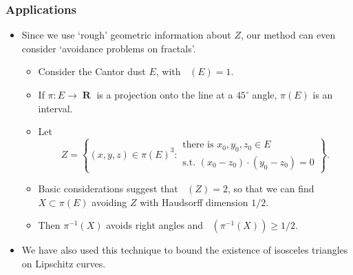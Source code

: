 \documentclass[usenames,dvipsnames]{beamer}
\DeclareMathOperator{\RR}{\textbf{R}}
\DeclareMathOperator{\hausdim}{\text{dim}_{\textbf{H}}}
\DeclareMathOperator{\minkdim}{\text{dim}_{\textbf{M}}}
\begin{document}
\begin{frame}
    \frametitle{Applications}

    \begin{itemize}
        \item Since we use `rough' geometric information about $Z$, our method can even consider `avoidance problems on fractals'.

        \pause
        \begin{itemize}
            \item Consider the Cantor dust $E$, with $\minkdim(E) = 1$.

            \pause
            \item If $\pi: E \to \RR$ is a projection onto the line at a $45^{\circ}$ angle, $\pi(E)$ is an interval.

            \pause
            \item Let
            \[ Z = \left\{ (x,y,z) \in \pi(E)^3 : \begin{array}{c}
            \text{there is $x_0, y_0, z_0 \in E$}\\
            \text{s.t. $(x_0 - z_0) \cdot (y_0 - z_0) = 0$}
        \end{array} \right\}. \]

            \pause
            \item Basic considerations suggest that $\minkdim(Z) = 2$, so that we can find $X \subset \pi(E)$ avoiding $Z$ with Haudsorff dimension $1/2$.

            \pause
            \item Then $\pi^{-1}(X)$ avoids right angles and $\hausdim(\pi^{-1}(X)) \geq 1/2$.
        \end{itemize}

        \pause
        \item We have also used this technique to bound the existence of isosceles triangles on Lipschitz curves.
    \end{itemize}
\end{frame}
\end{document}
